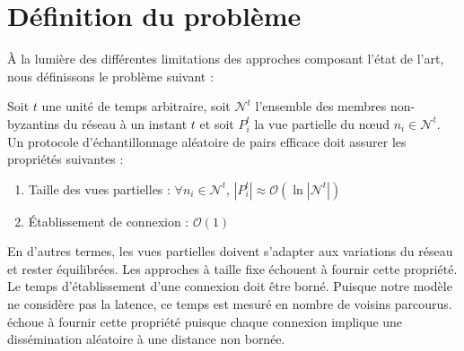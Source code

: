 
\section{Définition du problème}
\label{net:sec:problem}







À la lumière des différentes limitations des approches composant l'état de l'art, nous définissons le
problème suivant :

\begin{problem}
  \label{net:problem:properties}
  Soit $t$ une unité de temps arbitraire, soit $\mathcal{N}^t$ l'ensemble des
  membres non-byzantins du réseau à un instant $t$ et soit $P_i^t$ la vue
  partielle du nœud $n_i \in \mathcal{N}^t$. Un protocole d'échantillonnage
  aléatoire de pairs efficace doit assurer les propriétés suivantes :
  \begin{enumerate}
  \item Taille des vues partielles : \hfill $\forall n_i \in \mathcal{N}^t$,
    $|P_i^t| \approx \mathcal{O}(\ln |\mathcal{N}^t|)$
  \item Établissement de connexion : \hfill $\mathcal{O}(1)$
  \end{enumerate}
\end{problem}
En d'autres termes, les vues partielles doivent s'adapter aux variations du
réseau et rester équilibrées. Les approches à taille fixe échouent à fournir
cette propriété. Le temps d'établissement d'une connexion doit être
borné. Puisque notre modèle ne considère pas la latence, ce temps est mesuré en
nombre de voisins parcourus. \SCAMP échoue à fournir cette propriété puisque
chaque connexion implique une dissémination aléatoire à une distance non bornée.

